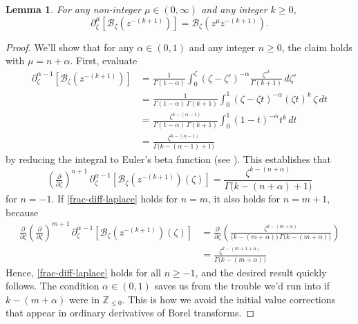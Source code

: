 \documentclass{article}
\theoremstyle{definition}
\newcommand{\Z}{\mathbb{Z}}
\newcommand{\borel}{\mathcal{B}}
\theoremstyle{plain}
\newtheorem{lemma}[definition]{Lemma}
\begin{document}
\begin{lemma}\label{lem:frac-deriv-Borel}
For any non-integer $\mu \in (0, \infty)$ and any integer $k \ge 0$,
\[ \partial^\mu_{\zeta } \left[ \borel_\zeta \left(z^{-(k+1)}\right) \right] =  \borel_\zeta \left(z^\mu z^{-(k+1)}\right). \]
\end{lemma}
\begin{proof}
We'll show that for any $\alpha \in (0, 1)$ and any integer $n \ge 0$, the claim holds with $\mu = n + \alpha$. First, evaluate
\begin{align*}
\partial^{\alpha-1}_{\zeta} \left[ \borel_\zeta \left(z^{-(k+1)}\right) \right] & = \frac{1}{\Gamma(1-\alpha)} \int_0^\zeta (\zeta-\zeta')^{-\alpha} \frac{{\zeta'}^k}{\Gamma(k+1)}\,d\zeta' \\
& = \frac{1}{\Gamma(1-\alpha)\,\Gamma(k+1)} \int_0^1 (\zeta-\zeta t)^{-\alpha} (\zeta t)^k\,\zeta\,dt \\
& = \frac{\zeta^{k-(\alpha-1)}}{\Gamma(1-\alpha)\,\Gamma(k+1)} \int_0^1 (1-t)^{-\alpha} t^k\,dt \\
& = \frac{\zeta^{k-(\alpha-1)}}{\Gamma\big(k-(\alpha-1)+1\big)}
\end{align*}
by reducing the integral to Euler's beta function (see \cite[Identity 5.12.1]{dlmf}). This establishes that
\begin{equation}\label{frac-diff-laplace}
\left(\tfrac{\partial}{\partial \zeta}\right)^{n+1}\,\partial^{\alpha-1}_{\zeta } \left[ \borel_\zeta \left(z^{-(k+1)}\right)(\zeta) \right] = \frac{\zeta^{k-(n+\alpha)}}{\Gamma\big(k-(n+\alpha)+1\big)}
\end{equation}
for $n = -1$. If \eqref{frac-diff-laplace} holds for $n = m$, it also holds for $n = m+1$, because
\begin{align*}
\tfrac{\partial}{\partial \zeta} \left(\tfrac{\partial}{\partial \zeta}\right)^{m+1}\,\partial^{\alpha-1}_{\zeta} \left[ \borel_\zeta \left(z^{-(k+1)}\right)(\zeta) \right] & = \tfrac{\partial}{\partial \zeta} \left( \frac{\zeta^{k-(m+\alpha)}}{\big(k-(m+\alpha)\big)\,\Gamma\big(k-(m+\alpha)\big)} \right) \\
& = \frac{\zeta^{k-(m+1+\alpha)}}{\Gamma\big(k-(m+\alpha)\big)}
\end{align*}
Hence, \eqref{frac-diff-laplace} holds for all $n \ge -1$, and the desired result quickly follows. The condition $\alpha \in (0, 1)$ saves us from the trouble we'd run into if $k-(m+\alpha)$ were in $\Z_{\le 0}$. This is how we avoid the initial value corrections that appear in ordinary derivatives of Borel transforms.
\end{proof}
\end{document}
